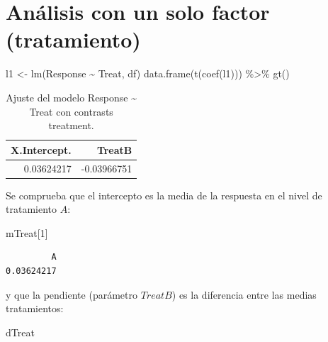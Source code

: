 \documentclass[
  12pt,
  a4paper,
  extrafontsizes,
  onecolumn,
  openright,
  table]{memoir}
\newenvironment{Shaded}{\begin{snugshade}}{\end{snugshade}}
\newcommand{\DecValTok}[1]{\textcolor[rgb]{0.68,0.00,0.00}{#1}}
\newcommand{\FunctionTok}[1]{\textcolor[rgb]{0.28,0.35,0.67}{#1}}
\newcommand{\NormalTok}[1]{\textcolor[rgb]{0.00,0.23,0.31}{#1}}
\newcommand{\OtherTok}[1]{\textcolor[rgb]{0.00,0.23,0.31}{#1}}
\newcommand{\SpecialCharTok}[1]{\textcolor[rgb]{0.37,0.37,0.37}{#1}}
\begin{document}
\normalsize

\hypertarget{anuxe1lisis-con-un-solo-factor-tratamiento}{%
\section{Análisis con un solo factor
(tratamiento)}\label{anuxe1lisis-con-un-solo-factor-tratamiento}}

\scriptsize

\begin{Shaded}
\begin{Highlighting}[]
\NormalTok{l1 }\OtherTok{\textless{}{-}} \FunctionTok{lm}\NormalTok{(Response }\SpecialCharTok{\textasciitilde{}}\NormalTok{ Treat, df)}
\FunctionTok{data.frame}\NormalTok{(}\FunctionTok{t}\NormalTok{(}\FunctionTok{coef}\NormalTok{(l1))) }\SpecialCharTok{\%\textgreater{}\%} \FunctionTok{gt}\NormalTok{()}
\end{Highlighting}
\end{Shaded}

\hypertarget{tbl-l1}{}
\begin{longtable}{rr}
\caption{\label{tbl-l1}Ajuste del modelo Response \textasciitilde{} Treat con contrasts
treatment. }\tabularnewline

\toprule
X.Intercept. & TreatB \\ 
\midrule
0.03624217 & -0.03966751 \\ 
\bottomrule
\end{longtable}

\normalsize

Se comprueba que el intercepto es la media de la respuesta en el nivel
de tratamiento \(A\):

\scriptsize

\begin{Shaded}
\begin{Highlighting}[]
\NormalTok{mTreat[}\DecValTok{1}\NormalTok{]}
\end{Highlighting}
\end{Shaded}

\begin{verbatim}
         A 
0.03624217 
\end{verbatim}

\normalsize

y que la pendiente (parámetro \(TreatB\)) es la diferencia entre las
medias tratamientos:

\scriptsize

\begin{Shaded}
\begin{Highlighting}[]
\NormalTok{dTreat}
\end{Highlighting}
\end{Shaded}
\end{document}
